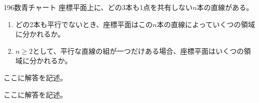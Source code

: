 \begin{thm}{196}{}{数青チャート}
 座標平面上に、どの3本も1点を共有しない$n$本の直線がある。
 \begin{enumerate}
  \item どの2本も平行でないとき、座標平面はこの$n$本の直線によっていくつの領域に分かれるか。
  \item $n\ge 2$として、平行な直線の組が一つだけある場合、座標平面はいくつの領域に分かれるか。
 \end{enumerate}
\end{thm}

ここに解答を記述。

ここに解答を記述。
